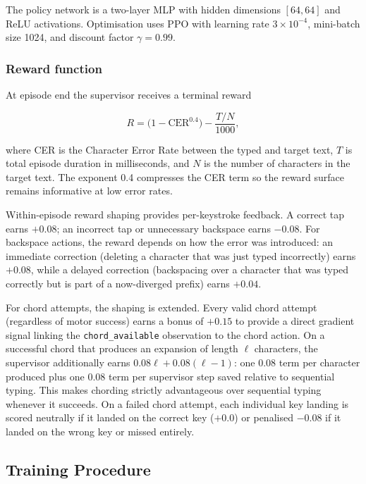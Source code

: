\documentclass[sigconf,review,anonymous]{acmart}
\begin{document}
The policy network is a two-layer MLP with hidden dimensions $[64, 64]$ and
ReLU activations.  Optimisation uses PPO with learning rate $3\times10^{-4}$,
mini-batch size 1024, and discount factor $\gamma = 0.99$.

\subsubsection*{Reward function}

At episode end the supervisor receives a terminal reward

\begin{equation}
  R = \bigl(1 - \mathrm{CER}^{0.4}\bigr) - \frac{T / N}{1000},
  \label{eq:reward}
\end{equation}

\noindent where CER is the Character Error Rate between the typed and target
text, $T$ is total episode duration in milliseconds, and $N$ is the number
of characters in the target text.  The exponent 0.4 compresses the CER term
so the reward surface remains informative at low error rates.

Within-episode reward shaping provides per-keystroke feedback.  A correct
tap earns $+0.08$; an incorrect tap or unnecessary backspace earns $-0.08$.
For backspace actions, the reward depends on how the error was introduced:
an immediate correction (deleting a character that was just typed
incorrectly) earns $+0.08$, while a delayed correction (backspacing over a
character that was typed correctly but is part of a now-diverged prefix)
earns $+0.04$. %

For chord attempts, the shaping is extended.  Every valid chord attempt
(regardless of motor success) earns a bonus of $+0.15$ to provide a direct
gradient signal linking the \texttt{chord\_available} observation to the
chord action.  On a successful chord that produces an expansion of length
$\ell$ characters, the supervisor additionally earns
$0.08\ell + 0.08(\ell-1)$: one $0.08$ term per character produced plus one
$0.08$ term per supervisor step saved relative to sequential typing.  This
makes chording strictly advantageous over sequential typing whenever it
succeeds.  On a failed chord attempt, each individual key landing is scored
neutrally if it landed on the correct key ($+0.0$) or penalised $-0.08$ if
it landed on the wrong key or missed entirely. %

\subsection{Training Procedure}
\label{sec:training}
\end{document}
